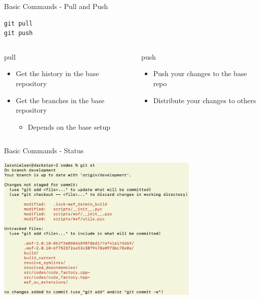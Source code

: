 \documentclass[table,svgnames,aspectratio=169]{beamer}
\begin{document}
\begin{frame}[fragile,label={sec:orgadc11c3}]{Basic Commands - Pull and Push}
 \lstset{language=bash,label= ,caption= ,captionpos=b,numbers=none}
\begin{lstlisting}
git pull 
git push 
\end{lstlisting}

\begin{columns}
\begin{column}[t]{0.5\columnwidth}
\alert{pull}
\begin{itemize}
\item Get the history in the base repository
\item Get the branches in the base repository 
\begin{itemize}
\item Depends on the base setup
\end{itemize}
\end{itemize}
\end{column}

\begin{column}[t]{0.5\columnwidth}
\alert{push}
\begin{itemize}
\item Push your changes to the base repo
\item Distribute your changes to others
\end{itemize}
\end{column}
\end{columns}
\end{frame}

\begin{frame}[label={sec:org9336622}]{Basic Commands - Status}
\begin{center}
\includegraphics[width=.75\textwidth,height=7cm]{graphics/status.png}
\end{center}
\end{frame}
\end{document}
